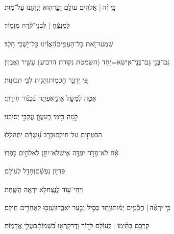\documentclass[12pt]{article}
\newcommand{\loc}[1]{\textsuperscript{\locf{#1}}}
\begin{document}
{\loc{ טו}~}‏כִּ֤י זֶ֨ה |  אֱלֹהִ֣ים  עוֹלָ֣ם וָעֶ֑ד{\hfill}ה֖וּא יְנַהֲגֵ֣נוּ עַל־מֽוּת׃\par\pend
\ledpb
\pstart[\subsection*{\textcolor{red}{פרק מט}}]\label{פרק מט}
{\loc{ א}~}‏לַמְנַצֵּ֬חַ | לִבְנֵי־קֹ֬רַח מִזְמֽוֹר׃\par

{\loc{ ב}~}‏שִׁמְעוּ־זֹ֭את כׇּל־הָעַמִּ֑ים{\hfill}הַ֝אֲזִ֗ינוּ כׇּל־יֹ֥שְׁבֵי חָֽלֶד׃\par

{\loc{ ג}~}‏גַּם־בְּנֵ֣י  גַּם־בְּנֵי־אִ֑ישׁ{\hfill}א=יַ֝חַד (השמטת נקודת הרביע) עָשִׁ֥יר וְאֶבְיֽוֹן׃\par

{\loc{ ד}~}‏פִּ֭י יְדַבֵּ֣ר חׇכְמ֑וֹת{\hfill}וְהָג֖וּת לִבִּ֣י תְבוּנֽוֹת׃\par

{\loc{ ה}~}‏אַטֶּ֣ה לְמָשָׁ֣ל אׇזְנִ֑י{\hfill}אֶפְתַּ֥ח בְּ֝כִנּ֗וֹר חִידָתִֽי׃\par

{\loc{ ו}~}‏לָ֣מָּה  בִּ֣ימֵי רָ֑ע{\hfill}עֲוֺ֖ן עֲקֵבַ֣י יְסוּבֵּֽנִי׃\par

{\loc{ ז}~}‏הַבֹּטְחִ֥ים עַל־חֵילָ֑ם{\hfill}וּבְרֹ֥ב עׇ֝שְׁרָ֗ם יִתְהַלָּֽלוּ׃\par

{\loc{ ח}~}‏אָ֗ח לֹא־פָדֹ֣ה יִפְדֶּ֣ה אִ֑ישׁ{\hfill}לֹא־יִתֵּ֖ן לֵאלֹהִ֣ים כׇּפְרֽוֹ׃\par

{\loc{ ט}~}‏ פִּדְי֥וֹן נַפְשָׁ֗ם{\hfill}וְחָדַ֥ל לְעוֹלָֽם׃\par

{\loc{ י}~}‏וִיחִי־ע֥וֹד לָנֶ֑צַח{\hfill}לֹ֖א יִרְאֶ֣ה הַשָּֽׁחַת׃\par

{\loc{ יא}~}‏כִּ֤י יִרְאֶ֨ה | {\hfill}חֲכָ֘מִ֤ים יָמ֗וּתוּ\newline\hspace*{.5em}יַ֤חַד כְּסִ֣יל וָבַ֣עַר יֹאבֵ֑דוּ{\hfill}וְעָזְב֖וּ לַאֲחֵרִ֣ים חֵילָֽם׃\par

{\loc{ יב}~}‏קִרְבָּ֤ם בָּתֵּ֨ימוֹ |  לְֽעוֹלָ֗ם{\hfill} לְד֣וֹר וָדֹ֑ר\newline\hspace*{.5em}קָרְא֥וּ בִ֝שְׁמוֹתָ֗ם{\hfill}עֲלֵ֣י אֲדָמֽוֹת׃\par
\end{document}
